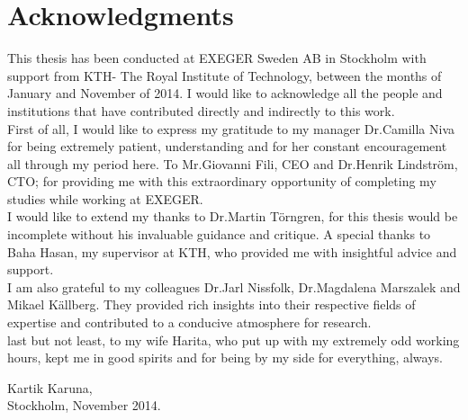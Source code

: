 \chapter*{Acknowledgments}
\thispagestyle{begin}


This thesis has been conducted at EXEGER Sweden AB in Stockholm with support from KTH- The Royal Institute of Technology, between the months of January and November of 2014. I would like to acknowledge all the people and institutions that have contributed directly and indirectly to this work.\\

First of all, I would like to express my gratitude to my manager Dr.Camilla Niva for being extremely patient, understanding and for her constant encouragement all through my period here. To Mr.Giovanni Fili, CEO and Dr.Henrik Lindström, CTO; for providing me with this extraordinary opportunity of completing my studies while working at EXEGER.\\

I would like to extend my thanks to Dr.Martin Törngren, for this thesis would be incomplete without his invaluable guidance and critique. A special thanks to Baha Hasan, my supervisor at KTH, who provided me with insightful advice and support.\\ 

I am also grateful to my colleagues Dr.Jarl Nissfolk, Dr.Magdalena Marszalek and Mikael Källberg. They provided rich insights into their respective fields of expertise and contributed to a conducive atmosphere for research.\\ 

last but not least, to my wife Harita, who put up with my extremely odd working hours, kept me in good spirits and for being by my side for everything, always.  

\begin{flushright}
Kartik Karuna,\\
Stockholm, November 2014.
\end{flushright}